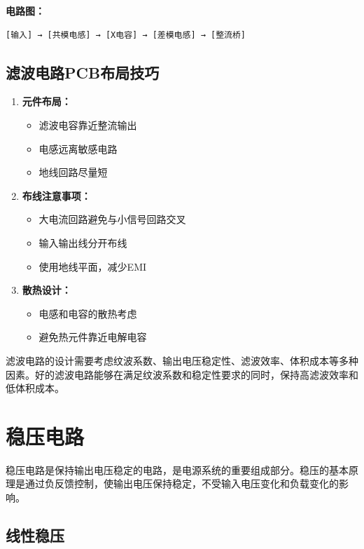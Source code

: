\documentclass[12pt,UTF8]{ctexbook}
\begin{document}
\textbf{电路图：}

\begin{verbatim}
[输入] → [共模电感] → [X电容] → [差模电感] → [整流桥]
\end{verbatim}

\subsection{滤波电路PCB布局技巧}

\begin{enumerate}
    \item \textbf{元件布局：}
    \begin{itemize}
        \item 滤波电容靠近整流输出
        \item 电感远离敏感电路
        \item 地线回路尽量短
    \end{itemize}

    \item \textbf{布线注意事项：}
    \begin{itemize}
        \item 大电流回路避免与小信号回路交叉
        \item 输入输出线分开布线
        \item 使用地线平面，减少EMI
    \end{itemize}

    \item \textbf{散热设计：}
    \begin{itemize}
        \item 电感和电容的散热考虑
        \item 避免热元件靠近电解电容
    \end{itemize}
\end{enumerate}

滤波电路的设计需要考虑纹波系数、输出电压稳定性、滤波效率、体积成本等多种因素。好的滤波电路能够在满足纹波系数和稳定性要求的同时，保持高滤波效率和低体积成本。

\section{稳压电路}

稳压电路是保持输出电压稳定的电路，是电源系统的重要组成部分。稳压的基本原理是通过负反馈控制，使输出电压保持稳定，不受输入电压变化和负载变化的影响。

\subsection{线性稳压}
\end{document}
